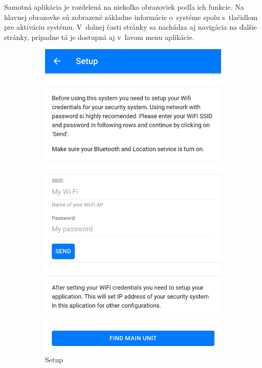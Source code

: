 Samotná aplikácia je rozdelená na niekoľko obrazoviek podľa ich funkcie. Na hlavnej obrazovke sú zobrazené základne informácie o~systéme spolu s~tlačidlom pre aktiváciu systému. V~dolnej časti stránky sa nachádza aj navigácia na ďalšie stránky, prípadne tá je dostupná aj v~ľavom menu aplikácie. 

\begin{figure}[!ht]
    \centering
    \begin{subfigure}{.4\textwidth}
      \centering
      \includegraphics[width=.8\linewidth]{obrazky-figures/screen_setup.jpg}  
      \caption{Setup}
      \label{fig:screen_setup}
    \end{subfigure}
    \begin{subfigure}{.4\textwidth}
      \centering

\end{subfigure}
\end{figure}
